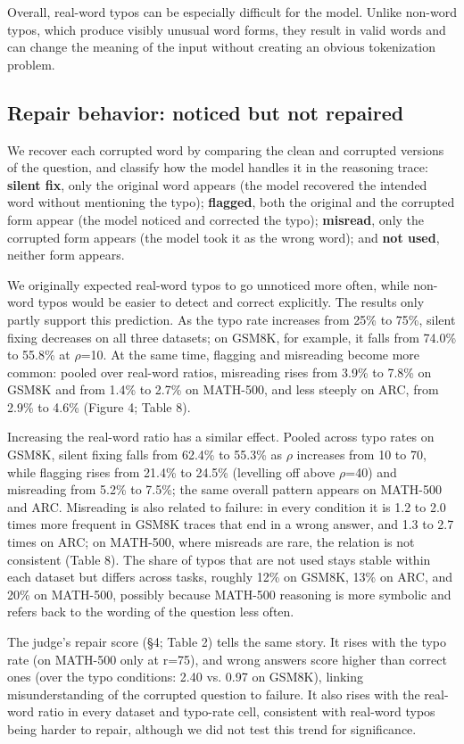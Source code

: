 \documentclass[11pt]{article}
\begin{document}
Overall, real-word typos can be especially difficult for the model. Unlike non-word typos, which produce visibly unusual word forms, they result in valid words and can change the meaning of the input without creating an obvious tokenization problem.

\subsection{Repair behavior: noticed but not repaired}
We recover each corrupted word by comparing the clean and corrupted versions of the question, and classify how the model handles it in the reasoning trace: \textbf{silent fix}, only the original word appears (the model recovered the intended word without mentioning the typo); \textbf{flagged}, both the original and the corrupted form appear (the model noticed and corrected the typo); \textbf{misread}, only the corrupted form appears (the model took it as the wrong word); and \textbf{not used}, neither form appears.

We originally expected real-word typos to go unnoticed more often, while non-word typos would be easier to detect and correct explicitly. The results only partly support this prediction. As the typo rate increases from 25\% to 75\%, silent fixing decreases on all three datasets; on GSM8K, for example, it falls from 74.0\% to 55.8\% at $\rho$=10. At the same time, flagging and misreading become more common: pooled over real-word ratios, misreading rises from 3.9\% to 7.8\% on GSM8K and from 1.4\% to 2.7\% on MATH-500, and less steeply on ARC, from 2.9\% to 4.6\% (Figure 4; Table 8).

Increasing the real-word ratio has a similar effect. Pooled across typo rates on GSM8K, silent fixing falls from 62.4\% to 55.3\% as $\rho$ increases from 10 to 70, while flagging rises from 21.4\% to 24.5\% (levelling off above $\rho$=40) and misreading from 5.2\% to 7.5\%; the same overall pattern appears on MATH-500 and ARC. Misreading is also related to failure: in every condition it is 1.2 to 2.0 times more frequent in GSM8K traces that end in a wrong answer, and 1.3 to 2.7 times on ARC; on MATH-500, where misreads are rare, the relation is not consistent (Table 8). The share of typos that are not used stays stable within each dataset but differs across tasks, roughly 12\% on GSM8K, 13\% on ARC, and 20\% on MATH-500, possibly because MATH-500 reasoning is more symbolic and refers back to the wording of the question less often.

The judge's repair score (\S4; Table 2) tells the same story. It rises with the typo rate (on MATH-500 only at r=75), and wrong answers score higher than correct ones (over the typo conditions: 2.40 vs. 0.97 on GSM8K), linking misunderstanding of the corrupted question to failure. It also rises with the real-word ratio in every dataset and typo-rate cell, consistent with real-word typos being harder to repair, although we did not test this trend for significance.
\end{document}
